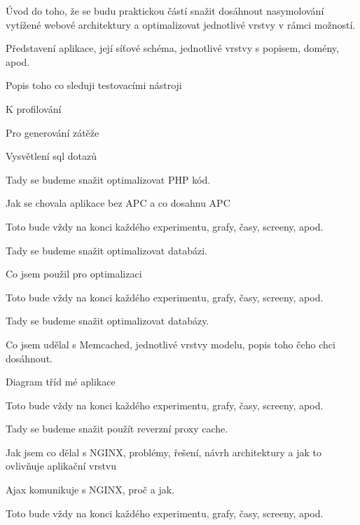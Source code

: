 \documentclass[12pt]{article}
\begin{document}
Úvod do toho, že se budu praktickou částí snažit dosáhnout nasymolování vytížené webové architektury a optimalizovat jednotlivé vrstvy v rámci možností.

Představení aplikace, její síťové schéma, jednotlivé vrstvy s popisem, domény, apod.

Popis toho co sleduji testovacími nástroji

K profilování

Pro generování zátěže

Vysvětlení sql dotazů

Tady se budeme snažit optimalizovat PHP kód.

Jak se chovala aplikace bez APC a co dosahnu APC

Toto bude vždy na konci každého experimentu, grafy, časy, screeny, apod.

Tady se budeme snažit optimalizovat databázi.

Co jsem použil pro optimalizaci

Toto bude vždy na konci každého experimentu, grafy, časy, screeny, apod.

Tady se budeme snažit optimalizovat databázy.

Co jsem udělal s Memcached, jednotlivé vrstvy modelu, popis toho čeho chci dosáhnout.

Diagram tříd mé aplikace

Toto bude vždy na konci každého experimentu, grafy, časy, screeny, apod.

Tady se budeme snažit použít reverzní proxy cache.

Jak jsem co dělal s NGINX, problémy, řešení, návrh architektury a jak to ovlivňuje aplikační vrstvu

Ajax komunikuje s NGINX, proč a jak.

Toto bude vždy na konci každého experimentu, grafy, časy, screeny, apod.
\end{document}
